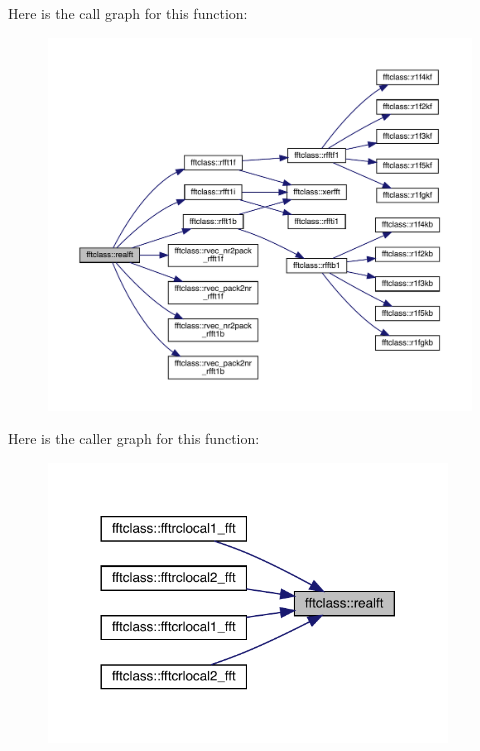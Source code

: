 Here is the call graph for this function\+:\nopagebreak
\begin{figure}[H]
\begin{center}
\leavevmode
\includegraphics[width=350pt]{namespacefftclass_a1aec6e8023ec23ff926a64c54c93ee1e_cgraph}
\end{center}
\end{figure}
Here is the caller graph for this function\+:\nopagebreak
\begin{figure}[H]
\begin{center}
\leavevmode
\includegraphics[width=300pt]{namespacefftclass_a1aec6e8023ec23ff926a64c54c93ee1e_icgraph}
\end{center}
\end{figure}
\mbox{\label{namespacefftclass_a2bdd31e65a4abb79ed9e0eeaa71cee6b}} 
